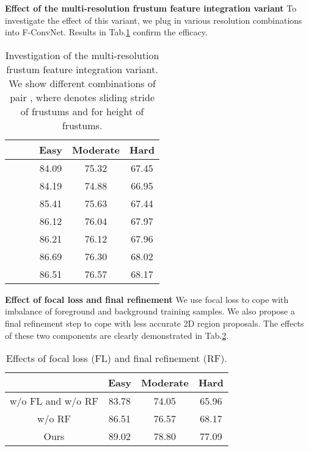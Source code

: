 \documentclass[letterpaper, 10 pt, conference]{ieeeconf}
\begin{document}
\vspace{0.1cm}
\label{Sec:Multi-Resolution}
\noindent\textbf{Effect of the multi-resolution frustum feature integration variant} To investigate the effect of this variant, we plug in various resolution combinations into F-ConvNet. Results in Tab.\ref{Tab:MultiResolution} confirm the efficacy.



\begin{table}[ht]
	\begin{center}
	\begin{tabular}{ccc|ccc}
		\hline
		 &  &  & Easy  & Moderate & Hard  \\ \hline
		             &              &              & 84.09 & 75.32    & 67.45 \\
		\checkmark   &              &              & 84.19 & 74.88    & 66.95 \\
		             & \checkmark   &              & 85.41 & 75.63    & 67.44 \\
		             &              & \checkmark   & 86.12 & 76.04    & 67.97 \\
		\checkmark   & \checkmark   &              & 86.21 & 76.12    & 67.96 \\
		             & \checkmark   & \checkmark   & 86.69 & 76.30    & 68.02 \\
		\checkmark   & \checkmark   & \checkmark   & 86.51 & 76.57    & 68.17 \\
		\hline
	\end{tabular}
	\caption{Investigation of the multi-resolution frustum feature integration variant. We show different combinations of pair , where  denotes sliding stride of frustums and  for height of frustums. }
	\label{Tab:MultiResolution}
	\end{center}
	\vspace{-0.5cm}
\end{table}

\noindent\textbf{Effect of focal loss and final refinement} We use focal loss\cite{lin2017focal} to cope with imbalance of foreground and background training samples. We also propose a final refinement step to cope with less accurate 2D region proposals. The effects of these two components are clearly demonstrated in Tab.\ref{Tab:FocalLoss}.

\begin{table}[ht]
	\begin{center}
		\begin{tabular}{c|ccc}
			\hline
			                  & Easy  & Moderate & Hard  \\ \hline
			w/o FL and w/o RF & 83.78 & 74.05    & 65.96 \\
			w/o RF            & 86.51 & 76.57    & 68.17 \\
			Ours              & 89.02 & 78.80    & 77.09 \\ \hline
		\end{tabular}
		\caption{Effects of focal loss (FL) and final refinement (RF).}
		\label{Tab:FocalLoss}	
	\end{center}
	\vspace{-0.5cm}
\end{table}
\end{document}
